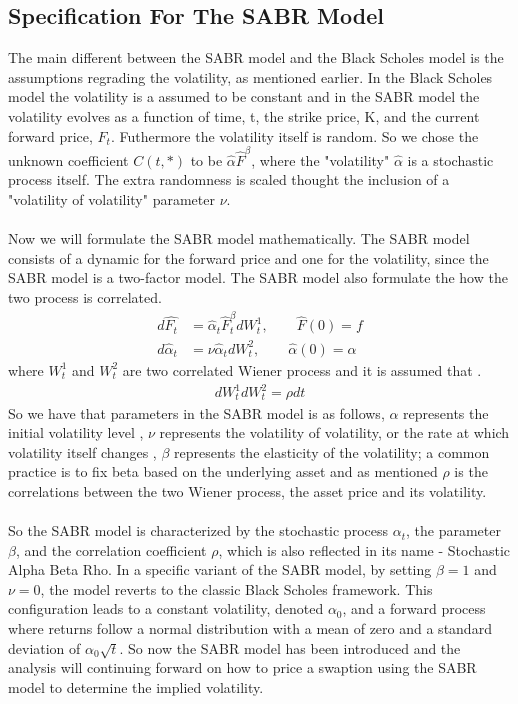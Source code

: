 \subsection{Specification For The SABR Model}
The main different between the SABR model and the 
Black Scholes model is the assumptions regrading the 
volatility, as mentioned earlier. In the Black Scholes 
model the volatility is a assumed to be constant and 
in the SABR model the volatility evolves as a function
of time, t, the strike price, K, and the current
forward price, $F_t$. Futhermore the volatility itself
is random. So we chose the unknown coefficient $C(t,*)$
to be $\hat{\alpha} \hat{F}^{\beta}$, where the 
"volatility" $\hat{\alpha}$ is a stochastic process itself. 
The extra randomness is scaled thought the inclusion 
of a "volatility of volatility" parameter $\nu$.
\\\\
Now we will formulate the SABR model mathematically. 
The SABR model consists of a dynamic for the forward price
and one for the volatility, since the SABR model is a 
two-factor model. The SABR model also formulate the 
how the two process is correlated. 
\begin{align}
    d \hat{F_t} &= 
    \hat{\alpha}_t \hat{F}_t^\beta dW_t^1, \quad \quad \hat{F}(0)=f   \label{f_dyn}\\
    d\hat{\alpha}_t &= \nu \hat{\alpha}_t dW_t^2, \quad \quad \hat{\alpha}(0)=\alpha \label{sigma_dyn}
\end{align}
where $W_t^{1}$ and $W_t^{2}$ are two correlated Wiener 
process and it is assumed that \cite{Smile}.
\begin{align}
    dW_t^{1}dW_t^{2}=\rho dt
\end{align}
So we have that 
parameters in the SABR model is as follows, $\alpha$ represents the initial volatility level
, $\nu$ represents the volatility of volatility, or the rate at which volatility itself changes
, $\beta$ represents the elasticity of the volatility; a common practice is to fix beta based on the underlying asset 
and as mentioned $\rho$ is the correlations between the 
two Wiener process, the asset price and its volatility. 
\\\\
So the SABR model is characterized by the stochastic process $\alpha_t$,
the parameter $\beta$, and the correlation coefficient $\rho$,
which is also reflected in its name - Stochastic Alpha Beta Rho.
In a specific variant of the SABR model, 
by setting $\beta = 1 $ and $\nu = 0$, the model reverts 
to the classic Black Scholes framework. 
This configuration leads to a constant volatility, 
denoted $\alpha_0 $, 
and a forward process where returns follow a 
normal distribution with a mean of zero and a standard 
deviation of $\alpha_0 \sqrt{t}$. So now the SABR model
has been introduced and the analysis will continuing forward 
on how to price a swaption using the SABR model to determine the implied
volatility.
